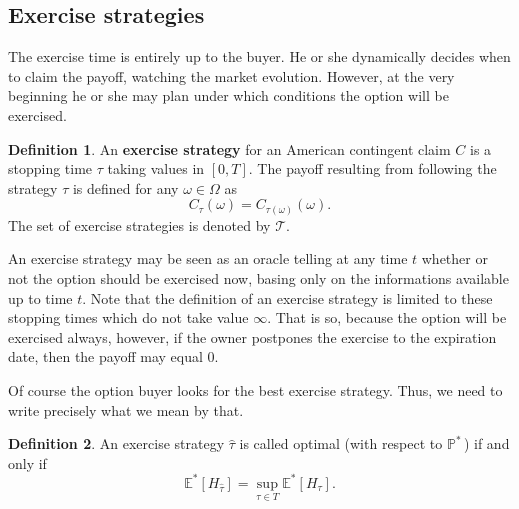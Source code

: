 \documentclass[a4paper,11pt, twoside]{book}
\theoremstyle{definition}
\newtheorem{mydef}{Definition}[chapter]
\theoremstyle{remark}
\def\Em{{\mathbb{E}^*}}
\def\Pm{{\mathbb{P}}^*\,}
\begin{document}
\subsection{Exercise strategies}
The exercise time is entirely up to the buyer. He or she dynamically decides when to claim the payoff, watching the market evolution. However, at the very beginning he or she may plan under which conditions the option will be exercised.
\begin{mydef}
 An \textbf{exercise strategy} for an American contingent claim $C$ is a stopping time $\tau$ taking values in $[0,T]$. The payoff resulting from following the strategy $\tau$ is defined for any $\omega \in \Omega$ as
 \[ C_{\tau}(\omega) = C_{\tau(\omega)}(\omega).\]
 The set of exercise strategies is denoted by $\mathcal{T}$. 
\end{mydef}
An exercise strategy may be seen as an oracle telling at any time $t$ whether or not the option should be exercised now, basing only on the informations available up to time $t$. Note that the definition of an exercise strategy is limited to these stopping times which do not take value $\infty$. That is so, because the option will be exercised always, however, if the owner postpones the exercise to the expiration date, then the payoff may equal 0.

Of course the option buyer looks for the best exercise strategy. Thus, we need to write precisely what we mean by that.
\begin{mydef}
 An exercise strategy $\hat{\tau}$ is called optimal (with respect to $\Pm$) if and only if
\begin{equation}
\label{eq:AM_optStrategy}
\Em[H_{\hat{\tau}}] = \sup\limits_{\tau \in T} \Em[H_{\tau}]. 
\end{equation}
\end{mydef}
\end{document}
